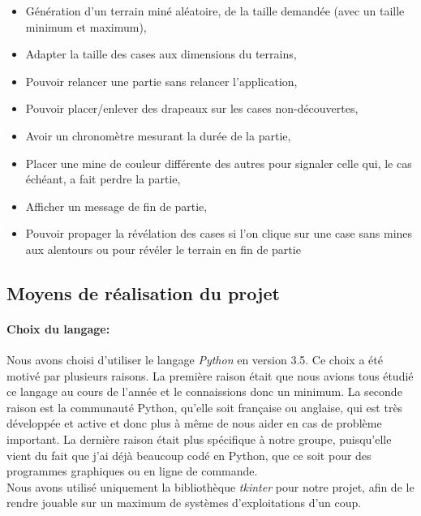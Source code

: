 \documentclass[12pt, a4paper]{article}
\begin{document}
\begin{itemize}
\item Génération d'un terrain miné aléatoire, de la taille demandée
(avec un taille minimum et maximum),
\item Adapter la taille des cases aux dimensions du terrains,
\item Pouvoir relancer une partie sans relancer l'application,
\item Pouvoir placer/enlever des drapeaux sur les cases non-découvertes,
\item Avoir un chronomètre mesurant la durée de la partie,
\item Placer une mine de couleur différente des autres pour signaler celle qui,
le cas échéant, a fait perdre la partie,
\item Afficher un message de fin de partie,
\item Pouvoir propager la révélation des cases si l'on clique sur une case sans
mines aux alentours ou pour révéler le terrain en fin de partie
\end{itemize}


\subsection{Moyens de réalisation du projet}

\paragraph{Choix du langage:}
Nous avons choisi d'utiliser le langage \emph{Python} en version 3.5. Ce choix
a été motivé par plusieurs raisons. La première raison était que nous avions
tous étudié ce langage au cours de l'année et le connaissions donc un minimum.
La seconde raison est la communauté Python, qu'elle soit française ou anglaise,
qui est très développée et active et donc plus à même de nous aider en cas
de problème important. La dernière raison était plus spécifique à notre groupe,
puisqu'elle vient du fait que j'ai déjà beaucoup codé en Python, que ce soit
pour des programmes graphiques ou en ligne de commande. \\
Nous avons utilisé uniquement la bibliothèque \emph{tkinter} pour notre projet,
afin de le rendre jouable sur un maximum de systèmes d'exploitations d'un coup.
\end{document}
